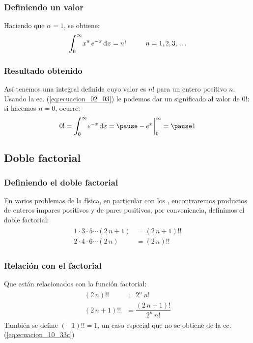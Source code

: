 \documentclass[12pt]{beamer}
\begin{document}
\begin{frame}
\frametitle{Definiendo un valor}
Haciendo que $\alpha = 1$, se obtiene:
\pause
\begin{align}
\scaleint{6ex}_{\bs 0}^{\infty} x^{n} \, e^{-x} \dd{x} = n! \hspace{1cm} n = 1, 2, 3, \ldots
\label{eq:ecuacion_02_03}
\end{align}
\end{frame}
\begin{frame}
\frametitle{Resultado obtenido}
Así tenemos una integral definida cuyo valor es $n!$ para un entero positivo $n$.
\\
\bigskip
\pause
Usando la ec. (\ref{eq:ecuacion_02_03}) le podemos dar un significado al valor de $0!$: si hacemos $n = 0$, ocurre:
\pause
\begin{eqnarray}
0! = \scaleint{6ex}_{\bs 0}^{\infty} e^{-x} \dd{x} = \pause -e^{x}\eval_{0}^{\infty} = \pause 1
\label{eq:ecuacion_02_04}
\end{eqnarray}
\end{frame}

\subsection{Doble factorial}

\begin{frame}
\frametitle{Definiendo el doble factorial}
En varios problemas de la física, en particular con los , encontraremos productos de enteros impares positivos y de pares positivos, por conveniencia, definimos el doble factorial:
\pause
\begin{align}
\begin{aligned}
1 \cdot 3 \cdot 5 \cdots (2 \, n+1) &= (2 \, n+1) !! \\
2 \cdot 4 \cdot 6 \cdots (2 \, n) &= (2 \, n) !!
\end{aligned}
\label{eq:ecuacion_10_33b}
\end{align}
\end{frame}
\begin{frame}
\frametitle{Relación con el factorial}
Que están relacionados con la función factorial:
\pause
\begin{align}
\begin{aligned}
(2 \, n)!! &=  2^{n} \: n! \\[1em]
(2 \, n+1)!! &= \dfrac{(2 \, n+1)!}{2^{n} \, n!}
\end{aligned}
\label{eq:ecuacion_10_33c}
\end{align}
\pause
También se define $(-1)!! = 1$, un caso especial que no se obtiene de la ec. (\ref{eq:ecuacion_10_33c})
\end{frame}
\end{document}
